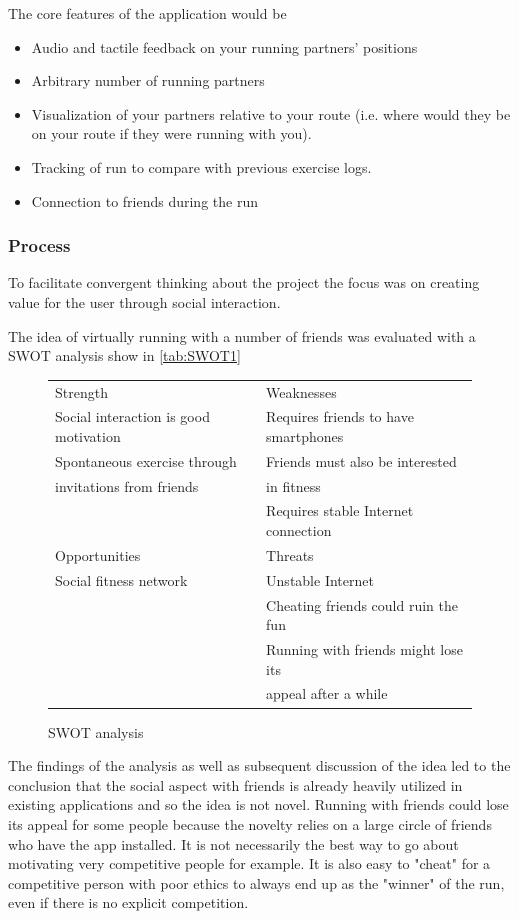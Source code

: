 The core features of the application would be 
\begin{itemize}
\item Audio and tactile feedback on your running partners' positions
\item Arbitrary number of running partners
\item Visualization of your partners relative to your route (i.e. where would they be on your route if they were running with you).
\item Tracking of run to compare with previous exercise logs.
\item Connection to friends during the run
\end{itemize}

\subsubsection{Process}
To facilitate convergent thinking about the project the focus was on creating value for the user through social interaction. 
\vspace{10pt}

The idea of virtually running with a number of friends was evaluated with a \ac{SWOT} analysis show in \autoref{tab:SWOT1}

\begin{figure}[ht]
 \caption{SWOT analysis}
 \label{tab:SWOT1}
 \begin{tabular}{| l | l |}
 \hline
Strength & Weaknesses \\ 
Social interaction is good motivation & Requires friends to have smartphones \\
Spontaneous exercise through & Friends must also be interested \\
invitations from friends &  in fitness \\
 & Requires stable Internet connection \\ \hline
Opportunities & Threats \\ 
Social fitness network & Unstable Internet \\
 & Cheating friends could ruin the fun \\
 & Running with friends might lose its \\
 & appeal after a while \\
\hline
 \end{tabular}
\end{figure}
\vspace{10pt}

The findings of the analysis as well as subsequent discussion of the idea led to the conclusion that the social aspect with friends is already heavily utilized in existing applications and so the idea is not novel. Running with friends could lose its appeal for some people because the novelty relies on a large circle of friends who have the app installed. It is not necessarily the best way to go about motivating very competitive people for example. It is also easy to "cheat" for a competitive person with poor ethics to always end up as the "winner" of the run, even if there is no explicit competition.

